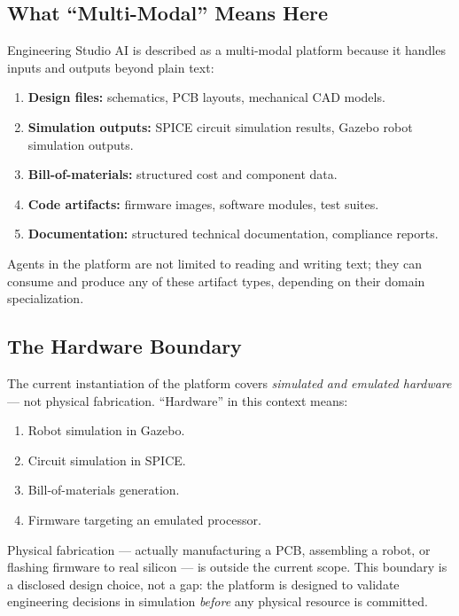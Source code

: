 \documentclass[12pt]{article}
\begin{document}
\subsection{What ``Multi-Modal'' Means Here}

Engineering Studio AI is described as a multi-modal platform because
it handles inputs and outputs beyond plain text:

\begin{enumerate}
    \item \textbf{Design files:} schematics, PCB layouts, mechanical
          CAD models.
    \item \textbf{Simulation outputs:} SPICE circuit simulation
          results, Gazebo robot simulation outputs.
    \item \textbf{Bill-of-materials:} structured cost and component
          data.
    \item \textbf{Code artifacts:} firmware images, software modules,
          test suites.
    \item \textbf{Documentation:} structured technical documentation,
          compliance reports.
\end{enumerate}

Agents in the platform are not limited to reading and writing text;
they can consume and produce any of these artifact types, depending on
their domain specialization.

\subsection{The Hardware Boundary}

The current instantiation of the platform covers
\emph{simulated and emulated hardware} --- not physical fabrication.
``Hardware'' in this context means:
\begin{enumerate}
    \item Robot simulation in Gazebo.
    \item Circuit simulation in SPICE.
    \item Bill-of-materials generation.
    \item Firmware targeting an emulated processor.
\end{enumerate}

Physical fabrication --- actually manufacturing a PCB, assembling
a robot, or flashing firmware to real silicon --- is outside the
current scope.
This boundary is a disclosed design choice, not a gap:
the platform is designed to validate engineering decisions in
simulation \emph{before} any physical resource is committed.
\end{document}
